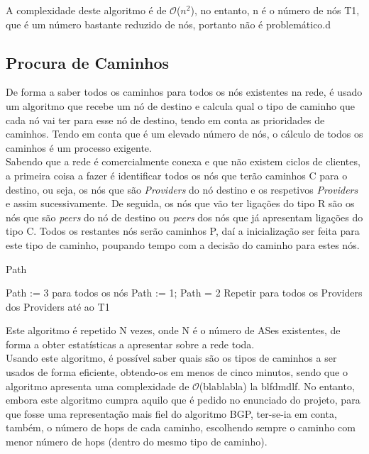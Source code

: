 \documentclass[twocolumn]{article} %
\begin{document}
			\noindent A complexidade deste algoritmo é de $\mathcal{O}$($n^{2}$), no entanto, n é o número de nós T1, que é um número bastante reduzido de nós, portanto não é problemático.d

		\subsection{Procura de Caminhos}
			De forma a saber todos os caminhos para todos os nós existentes na rede, é usado um algoritmo que recebe um nó de destino e calcula qual o tipo de caminho que cada nó vai ter para esse nó de destino, tendo em conta as prioridades de caminhos. Tendo em conta que é um elevado número de nós, o cálculo de todos os caminhos é um processo exigente.\\
			
			\noindent Sabendo que a rede é comercialmente conexa e que não existem ciclos de clientes, a primeira coisa a fazer é identificar todos os nós que terão caminhos C para o destino, ou seja, os nós que são \emph{Providers} do nó destino e os respetivos \emph{Providers} e assim sucessivamente. De seguida, os nós que vão ter ligações do tipo R são os nós que são \emph{peers} do nó de destino ou \emph{peers} dos nós que já apresentam ligações do tipo C. Todos os restantes nós serão caminhos P, daí a inicialização ser feita para este tipo de caminho, poupando tempo com a decisão do caminho para estes nós.\\

			\begin{algorithm}[htbp]
			\caption{Path}
			\begin{algorithmic}[1]
				
				\State Path := 3 para todos os nós
					\State Path := 1;
							\State Path = 2
						\EndIf
					\EndFor
					\State Repetir para todos os Providers dos Providers até ao T1
				\EndFor

			\end{algorithmic}
			\end{algorithm}

			\noindent Este algoritmo é repetido N vezes, onde N é o número de ASes existentes, de forma a obter estatísticas a apresentar sobre a rede toda.\\

			\noindent Usando este algoritmo, é possível saber quais são os tipos de caminhos a ser usados de forma eficiente, obtendo-os em menos de cinco minutos, sendo que o algoritmo apresenta uma complexidade de $\mathcal{O}$(blablabla) la blfdmdlf. No entanto, embora este algoritmo cumpra aquilo que é pedido no enunciado do projeto, para que fosse uma representação mais fiel do algoritmo BGP, ter-se-ia em conta, também, o número de hops de cada caminho, escolhendo sempre o caminho com menor número de hops (dentro do mesmo tipo de caminho).\\
\end{document}
